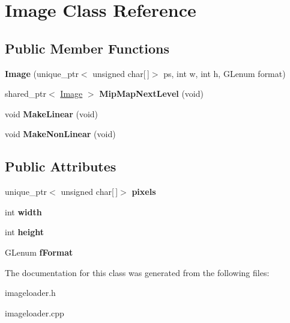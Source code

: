\hypertarget{classImage}{\section{\-Image \-Class \-Reference}
\label{classImage}
}
\subsection*{\-Public \-Member \-Functions}
\begin{DoxyCompactItemize}
\item 
\hypertarget{classImage_a0abc539ed1d327ca5da080c453982f14}{{\bfseries \-Image} (unique\-\_\-ptr$<$ unsigned char\mbox{[}$\,$\mbox{]}$>$ ps, int w, int h, \-G\-Lenum format)}\label{classImage_a0abc539ed1d327ca5da080c453982f14}

\item 
\hypertarget{classImage_ae4ed673d6be00f0cfb2df2410c7a5ddb}{shared\-\_\-ptr$<$ \hyperlink{classImage}{\-Image} $>$ {\bfseries \-Mip\-Map\-Next\-Level} (void)}\label{classImage_ae4ed673d6be00f0cfb2df2410c7a5ddb}

\item 
\hypertarget{classImage_ac3b91b0bc923fdda0e7fedef1456acd7}{void {\bfseries \-Make\-Linear} (void)}\label{classImage_ac3b91b0bc923fdda0e7fedef1456acd7}

\item 
\hypertarget{classImage_a991284fc31c908c88ca72120ca2cb33e}{void {\bfseries \-Make\-Non\-Linear} (void)}\label{classImage_a991284fc31c908c88ca72120ca2cb33e}

\end{DoxyCompactItemize}
\subsection*{\-Public \-Attributes}
\begin{DoxyCompactItemize}
\item 
\hypertarget{classImage_a079cb28309d40bbd15b4ed9fc536d8da}{unique\-\_\-ptr$<$ unsigned char\mbox{[}$\,$\mbox{]}$>$ {\bfseries pixels}}\label{classImage_a079cb28309d40bbd15b4ed9fc536d8da}

\item 
\hypertarget{classImage_ab8d12f635013c04159cd4d3d972bac88}{int {\bfseries width}}\label{classImage_ab8d12f635013c04159cd4d3d972bac88}

\item 
\hypertarget{classImage_a51df43db420c9c0b57536cb2dd36de5c}{int {\bfseries height}}\label{classImage_a51df43db420c9c0b57536cb2dd36de5c}

\item 
\hypertarget{classImage_ad8090c015d2ba2c62ade6278ee1a0f8d}{\-G\-Lenum {\bfseries f\-Format}}\label{classImage_ad8090c015d2ba2c62ade6278ee1a0f8d}

\end{DoxyCompactItemize}


\-The documentation for this class was generated from the following files\-:\begin{DoxyCompactItemize}
\item 
imageloader.\-h\item 
imageloader.\-cpp\end{DoxyCompactItemize}
